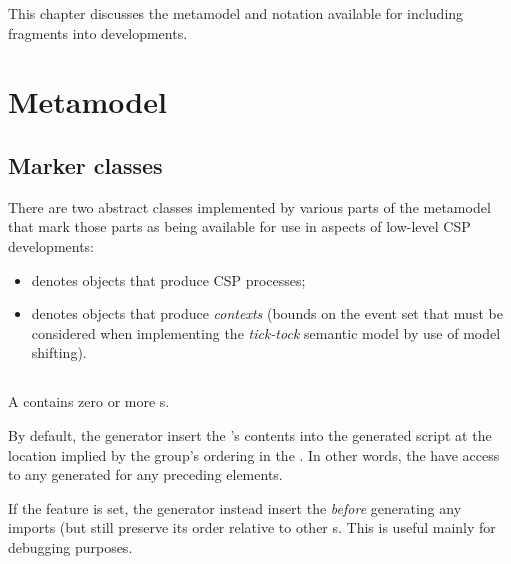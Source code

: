 
This chapter discusses the metamodel and notation available for including
\cspm{} fragments into \langname{} developments.

\section{Metamodel}

\subsection{Marker classes}


There are two abstract classes implemented by various parts of the \langname{}
metamodel that mark those parts as being available for use in aspects of
low-level CSP developments:

\begin{itemize}
\item
	\mcspprocesssource{} denotes objects that produce CSP processes;
\item
	\mcspcontextsource{} denotes objects that produce \emph{contexts}
	(bounds on the event set that must be considered when implementing the
	\emph{tick-tock} semantic model by use of model shifting).
\end{itemize}

\subsection{\mcspgroup}

A \mcspgroup{} contains zero or more \mcspfragment s.

By default, the generator \rfcshould{} insert the
\mcspgroup 's contents into the generated \cspm{} script at the
location implied by the group's ordering in the \mrapackage.  In other words,
the \mcspgroup{} \rfcshould{} have access to any \cspm{} generated for any
preceding elements.

If the  feature is set, the generator \rfcmust{} instead
insert the \mcspgroup{} \emph{before} generating any imports (but \rfcshould{}
still preserve its order relative to other  \mcspgroup s.
This is useful mainly for debugging purposes.

\subsection{\mcspfragment}

